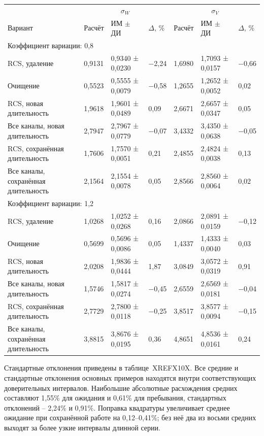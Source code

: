 \setlength{\tabcolsep}{2pt}
\begin{tabular}{p{4.16cm}p{1.61cm}p{2.83cm}p{1.28cm}p{1.61cm}p{2.83cm}p{1.28cm}}
\toprule
 & \multicolumn{3}{c}{$\sigma_W$} & \multicolumn{3}{c}{$\sigma_V$} \\
Вариант & Расчёт & ИМ $\pm$ ДИ & $\Delta$, \% & Расчёт & ИМ $\pm$ ДИ & $\Delta$, \% \\
\midrule
\multicolumn{7}{l}{Коэффициент вариации: 0,8} \\
RCS, удаление & 0,9131 & 0,9340 ± 0,0230 & −2,24 & 1,6980 & 1,7093 ± 0,0157 & −0,66 \\
Очищение & 0,5523 & 0,5555 ± 0,0079 & −0,58 & 1,2655 & 1,2652 ± 0,0052 & 0,02 \\
RCS, новая длительность & 1,9618 & 1,9601 ± 0,0489 & 0,09 & 2,6671 & 2,6657 ± 0,0347 & 0,05 \\
Все каналы, новая длительность & 2,7947 & 2,7967 ± 0,0779 & −0,07 & 3,4332 & 3,4350 ± 0,0638 & −0,05 \\
RCS, сохранённая длительность & 1,7606 & 1,7570 ± 0,0051 & 0,21 & 2,4855 & 2,4824 ± 0,0038 & 0,13 \\
Все каналы, сохранённая длительность & 2,1564 & 2,1554 ± 0,0078 & 0,05 & 2,8566 & 2,8560 ± 0,0064 & 0,02 \\
\multicolumn{7}{l}{Коэффициент вариации: 1,2} \\
RCS, удаление & 1,0268 & 1,0252 ± 0,0268 & 0,16 & 2,0866 & 2,0891 ± 0,0159 & −0,12 \\
Очищение & 0,5699 & 0,5696 ± 0,0086 & 0,05 & 1,4337 & 1,4333 ± 0,0040 & 0,03 \\
RCS, новая длительность & 2,0208 & 1,9836 ± 0,0444 & 1,87 & 3,0849 & 3,0572 ± 0,0319 & 0,91 \\
Все каналы, новая длительность & 1,5746 & 1,5817 ± 0,0274 & −0,45 & 2,6559 & 2,6569 ± 0,0181 & −0,04 \\
RCS, сохранённая длительность & 2,7729 & 2,7800 ± 0,0118 & −0,25 & 3,8517 & 3,8577 ± 0,0094 & −0,15 \\
Все каналы, сохранённая длительность & 3,8815 & 3,8676 ± 0,0195 & 0,36 & 4,8651 & 4,8536 ± 0,0161 & 0,24 \\
\bottomrule
\end{tabular}




Стандартные отклонения приведены в таблице~XREFX10X. Все средние и стандартные отклонения основных примеров находятся внутри соответствующих доверительных интервалов. Наибольшие абсолютные расхождения средних составляют 1,55\% для ожидания и 0,61\% для пребывания, стандартных отклонений -- 2,24\% и 0,91\%. Поправка квадратуры увеличивает среднее ожидание при сохранённой работе на 0,12--0,41\%; без неё два из восьми средних выходят за более узкие интервалы длинной серии.

